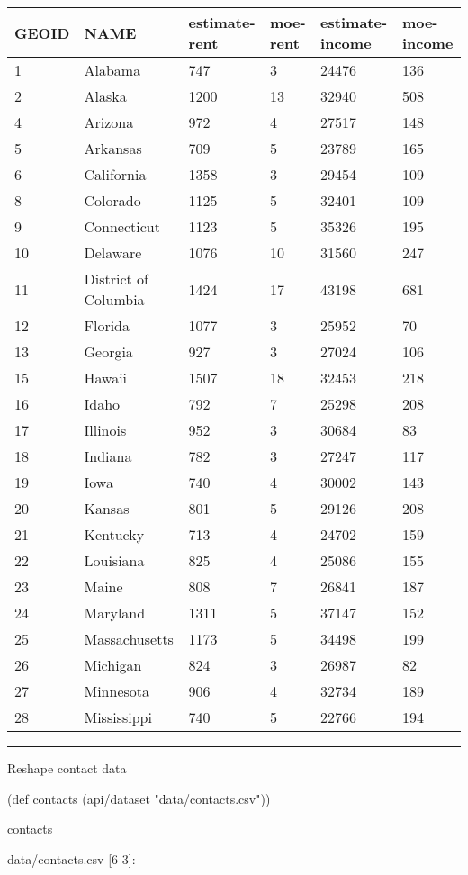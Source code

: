 \documentclass[]{article}
\newenvironment{Shaded}{\begin{snugshade}}{\end{snugshade}}
\newcommand{\StringTok}[1]{\textcolor[rgb]{0.31,0.60,0.02}{#1}}
\newcommand{\FunctionTok}[1]{\textcolor[rgb]{0.00,0.00,0.00}{#1}}
\newcommand{\BuiltInTok}[1]{#1}
\newcommand{\NormalTok}[1]{#1}
\begin{document}
\begin{longtable}[]{@{}llllll@{}}
\toprule
GEOID & NAME & estimate-rent & moe-rent & estimate-income &
moe-income\tabularnewline
\midrule
\endhead
1 & Alabama & 747 & 3 & 24476 & 136\tabularnewline
2 & Alaska & 1200 & 13 & 32940 & 508\tabularnewline
4 & Arizona & 972 & 4 & 27517 & 148\tabularnewline
5 & Arkansas & 709 & 5 & 23789 & 165\tabularnewline
6 & California & 1358 & 3 & 29454 & 109\tabularnewline
8 & Colorado & 1125 & 5 & 32401 & 109\tabularnewline
9 & Connecticut & 1123 & 5 & 35326 & 195\tabularnewline
10 & Delaware & 1076 & 10 & 31560 & 247\tabularnewline
11 & District of Columbia & 1424 & 17 & 43198 & 681\tabularnewline
12 & Florida & 1077 & 3 & 25952 & 70\tabularnewline
13 & Georgia & 927 & 3 & 27024 & 106\tabularnewline
15 & Hawaii & 1507 & 18 & 32453 & 218\tabularnewline
16 & Idaho & 792 & 7 & 25298 & 208\tabularnewline
17 & Illinois & 952 & 3 & 30684 & 83\tabularnewline
18 & Indiana & 782 & 3 & 27247 & 117\tabularnewline
19 & Iowa & 740 & 4 & 30002 & 143\tabularnewline
20 & Kansas & 801 & 5 & 29126 & 208\tabularnewline
21 & Kentucky & 713 & 4 & 24702 & 159\tabularnewline
22 & Louisiana & 825 & 4 & 25086 & 155\tabularnewline
23 & Maine & 808 & 7 & 26841 & 187\tabularnewline
24 & Maryland & 1311 & 5 & 37147 & 152\tabularnewline
25 & Massachusetts & 1173 & 5 & 34498 & 199\tabularnewline
26 & Michigan & 824 & 3 & 26987 & 82\tabularnewline
27 & Minnesota & 906 & 4 & 32734 & 189\tabularnewline
28 & Mississippi & 740 & 5 & 22766 & 194\tabularnewline
\bottomrule
\end{longtable}

\begin{center}\rule{0.5\linewidth}{0.5pt}\end{center}

Reshape contact data

\begin{Shaded}
\begin{Highlighting}[]
\NormalTok{(}\BuiltInTok{def}\FunctionTok{ contacts }\NormalTok{(api/dataset }\StringTok{"data/contacts.csv"}\NormalTok{))}
\end{Highlighting}
\end{Shaded}

\begin{Shaded}
\begin{Highlighting}[]
\NormalTok{contacts}
\end{Highlighting}
\end{Shaded}

data/contacts.csv {[}6 3{]}:
\end{document}
